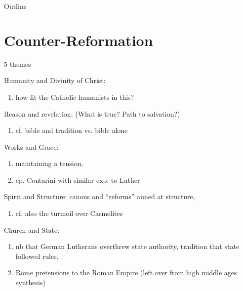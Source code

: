 

\maketitle
\begin{frame}{Outline}
\setcounter{tocdepth}{1}
\tableofcontents
\end{frame}

\section{Counter-Reformation}
\label{sec-1}
\begin{frame}[label=sec-1-1]{5 themes}
\begin{block}{Humanity and Divinity of Christ:}\pause
\begin{enumerate}
\item how fit the Catholic humanists in this?\pause
\end{enumerate}
\end{block}

\begin{block}{Reason and revelation: (What is true? Path to salvation?)}\pause
\begin{enumerate}
\item cf. bible and tradition vs. bible alone\pause
\end{enumerate}
\end{block}

\begin{block}{Works and Grace:}\pause
\begin{enumerate}
\item maintaining a tension,
\item cp. Contarini with similar exp. to Luther\pause
\end{enumerate}
\end{block}
\end{frame}

\begin{frame}[label=sec-1-2]{}
\begin{block}{Spirit and Structure: canons and ``reforms'' aimed at structure,}\pause
\begin{enumerate}
\item cf. also the turmoil over Carmelites\pause
\end{enumerate}
\end{block}

\begin{block}{Church and State:}\pause
\begin{enumerate}
\item nb that German Lutherans overthrew state authority, tradition that state followed ruler,
\item Rome pretensions to the Roman Empire (left over from high middle ages synthesis)
\end{enumerate}
\end{block}
\end{frame}
